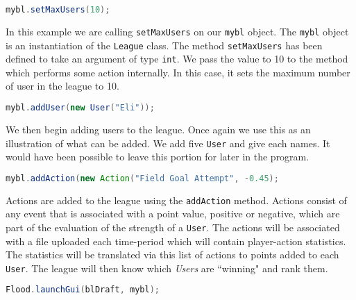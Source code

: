 \documentclass[12pt]{report}
\begin{document}
\begin{lstlisting}[language=Java,label=some-code,caption=Setting the maximum number of users]
mybl.setMaxUsers(10);
\end{lstlisting}

\begin{doublespace}
In this example we are calling \texttt{setMaxUsers} on our \texttt{mybl} object. The \texttt{mybl} object is an instantiation of the \texttt{League} class. The method \texttt{setMaxUsers} has been defined to take an argument of type \texttt{int}. We pass the value to 10 to the method which performs some action internally. In this case, it sets the maximum number of user in the league to 10.
\end{doublespace}

\begin{lstlisting}[language=Java,label=some-code,caption=Adding a new User]
mybl.addUser(new User("Eli"));
\end{lstlisting}

\begin{doublespace}
We then begin adding users to the league. Once again we use this as an illustration of what can be added. We add five \texttt{User} and give each names. It would have been possible to leave this portion for later in the program.
\end{doublespace}

\begin{lstlisting}[language=Java,label=some-code,caption=Adding a new Action]
mybl.addAction(new Action("Field Goal Attempt", -0.45);
\end{lstlisting}

\begin{doublespace}
Actions are added to the league using the \texttt{addAction} method. Actions consist of any event that is associated with a point value, positive or negative, which are part of the evaluation of the strength of a \texttt{User}. The actions will be associated with a file uploaded each time-period which will contain player-action statistics. The statistics will be translated via this list of actions to points added to each \texttt{User}. The league will then know which \textit{Users} are ``winning" and rank them. 
\end{doublespace}

\begin{lstlisting}[language=Java,label=some-code,caption=Launching the GUI]
Flood.launchGui(blDraft, mybl);
\end{lstlisting}
\end{document}
